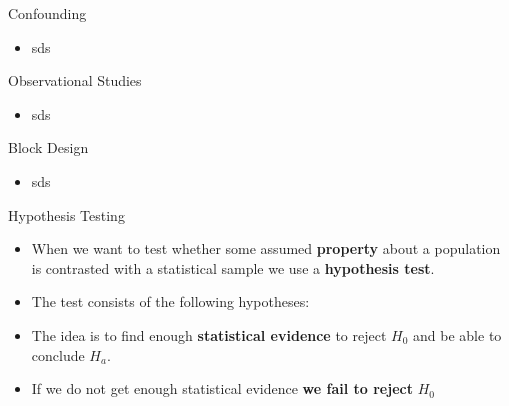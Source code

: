 \documentclass[handout]{beamer}
\begin{document}
\begin{frame}{Confounding}
\scriptsize{

\begin{itemize}

 \item sds
  
\end{itemize}



} 
\end{frame}

\begin{frame}{Observational Studies}
\scriptsize{

\begin{itemize}

 \item sds
  
\end{itemize}



} 
\end{frame}


\begin{frame}{Block Design}
\scriptsize{

\begin{itemize}

 \item sds
  
\end{itemize}



} 
\end{frame}



\begin{frame}{Hypothesis Testing}
\scriptsize{
\begin{itemize}
 \item When we want to test whether some assumed \textbf{property} about a population is contrasted with a statistical sample we use a \textbf{hypothesis test}.
\item The test consists of the following hypotheses:
\item The idea is to find enough \textbf{statistical evidence} to reject $H_{0}$ and be able to conclude $H_{a}$.
\item If we do not get enough statistical evidence \textbf{we fail to reject} $H_{0}$

\end{itemize}



} 
\end{frame}
\end{document}
